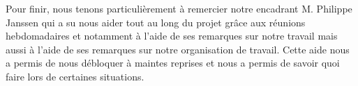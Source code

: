 \smallbreak
Pour finir, nous tenons particulièrement à remercier notre encadrant M. Philippe Janssen qui a su nous aider tout au long du projet grâce aux réunions hebdomadaires et notamment à l'aide de ses remarques sur notre travail mais aussi à l'aide de ses remarques sur notre organisation de travail. Cette aide nous a permis de nous débloquer à maintes reprises et nous a permis de savoir quoi faire lors de certaines situations.\newline
